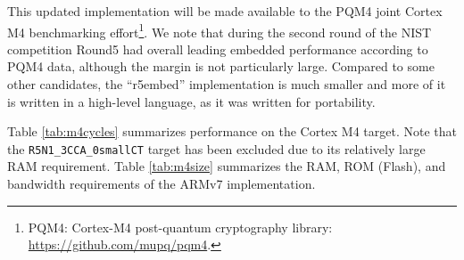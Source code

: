 \documentclass[a4paper]{article}
\begin{document}
This updated implementation will be made available to the PQM4 joint Cortex M4
benchmarking effort\footnote{PQM4: Cortex-M4 post-quantum cryptography library:
\url{https://github.com/mupq/pqm4}.}. We note that during the second round of
the NIST competition Round5 had overall leading embedded performance according
to PQM4 data, although the margin is not particularly large. Compared to
some other candidates, the ``r5embed'' implementation is much smaller and more
of it is written in a high-level language, as it was written for portability.

Table \ref{tab:m4cycles} summarizes performance on the Cortex M4 target.
Note that the \verb|R5N1_3CCA_0smallCT| target has been excluded due to its
relatively large RAM requirement. Table \ref{tab:m4size} summarizes the
RAM, ROM (Flash), and bandwidth requirements of the ARMv7 implementation.
\end{document}
